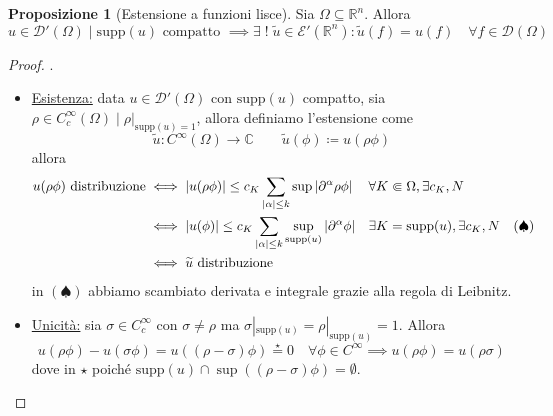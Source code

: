 \documentclass[a4paper,10pt]{article}
\theoremstyle{definition}
\newcommand{\re}{\mathbb{R}} %
\newcommand{\im}{\mathbb{C}} %
\newcommand{\supp}{\text{supp}} %
\theoremstyle{indentdefinition}
\theoremstyle{indenttheorem}
\newtheorem{prop}{Proposizione}
\theoremstyle{myremark}
\theoremstyle{indentgeneral}
\newenvironment{myboxed} 
{\noindent\begin{lrbox}{\mybox}\begin{minipage}{\textwidth}}
{\end{minipage}\end{lrbox}\fbox{\usebox{\mybox}}}
\begin{document}
\begin{myboxed}
    \begin{prop}[Estensione a funzioni lisce]
        Sia $\Omega\subseteq\re^n$. Allora
       $$u\in\mathcal{D}'(\Omega)\mid \supp(u) \text{ compatto } \implies \exists\;!\;\widetilde{u}\in\mathcal{E}'(\re^n): \widetilde{u}(f)=u(f)\quad \forall f\in \mathcal{D}(\Omega)$$
    \end{prop}
\end{myboxed}
\begin{proof}
    .
    \begin{itemize}
        \item \underline{Esistenza:} data $u\in \mathcal{D}'(\Omega)$ con $\supp(u)$ compatto, sia $\rho\in C^\infty_c(\Omega)\mid\rho|_{\supp(u)=1}$, allora definiamo l'estensione come 
        $$\widetilde{u}:C^\infty(\Omega)\to \im \qquad \boxed{\widetilde{u}(\phi)\coloneqq u(\rho\phi)}$$
        allora
        \begin{align*}
            u(\rho\phi) \text{ distribuzione} &\iff\abs{u(\rho\phi)}\le c_K\sum_{\abs{\alpha}\le k}\sup\abs{\partial^\alpha \rho\phi} && \forall K\Subset \Omega, \exists c_K,N\\
            &\iff\abs{u(\phi)}\le c_K\sum_{\abs{\alpha}\le k}\sup_{\supp(u)}\abs{\partial^\alpha \phi} && \exists K=\supp(u), \exists c_K,N \quad (\spadesuit)\\
            &\iff \widetilde{u} \text{ distribuzione}
        \end{align*}
        in $(\spadesuit)$ abbiamo scambiato derivata e integrale grazie alla regola di Leibnitz.
        \item \underline{Unicità:} sia $\sigma\in C_c^\infty$ con $\sigma\ne\rho$ ma $\sigma|_{\supp(u)}=\rho|_{\supp(u)}=1$. Allora
        $$u(\rho\phi)-u(\sigma\phi)=u((\rho-\sigma)\phi)\overset{\star}{=}0 \quad \forall \phi\in C^\infty\implies u(\rho\phi)=u(\rho\sigma)$$
        dove in $\star$ poiché $\supp(u)\cap \sup((\rho-\sigma)\phi)=\emptyset$. 
    \end{itemize}
\end{proof}
\end{document}
